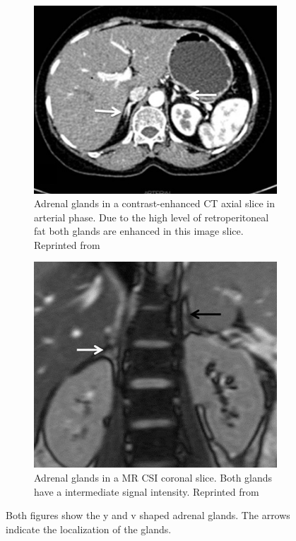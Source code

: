 \documentclass{article}
\begin{document}
\begin{figure}
    \centering
    \begin{subfigure}[b]{0.45\textwidth}
        \centering
        \includegraphics[width=\textwidth]{figures/CT_adrenal_enhanced.png}
        \caption{Adrenal glands in a contrast-enhanced CT axial slice in arterial phase. Due to the high level of retroperitoneal fat both glands are enhanced in this image slice. Reprinted from \cite{Panda2015}}
        \label{fig:adrenal_ct}
    \end{subfigure}
    \hfill
    \begin{subfigure}[b]{0.45\textwidth}
        \centering
        \includegraphics[width=\textwidth]{figures/MRI_adrenal.png}
        \caption{Adrenal glands in a MR CSI coronal slice. Both glands have a intermediate signal intensity. Reprinted from \cite{Panda2015} }
        \label{fig:adrenal_mri}
    \end{subfigure}
    \caption{Both figures show the y and v shaped adrenal glands. The arrows indicate the localization of the glands.}
    \label{fig:three graphs}
\end{figure}
\end{document}
